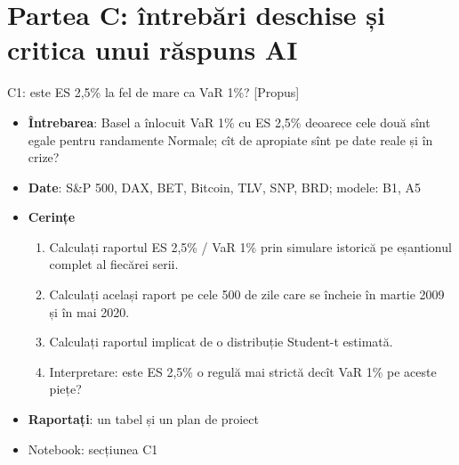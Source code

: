 \section{Partea C: întrebări deschise și critica unui răspuns AI}

\begin{frame}{C1: este ES 2,5\% la fel de mare ca VaR 1\%? [Propus]}
\itemsize{\footnotesize}
\begin{itemize}
\item \textbf{Întrebarea}: Basel a înlocuit VaR 1\% cu ES 2,5\% deoarece cele două sînt egale pentru randamente Normale; cît de apropiate sînt pe date reale și în crize?
\item \textbf{Date}: S\&P 500, DAX, BET, Bitcoin, TLV, SNP, BRD; modele: B1, A5
\item \textbf{Cerințe}
\begin{enumerate}
    \item Calculați raportul ES 2,5\% / VaR 1\% prin simulare istorică pe eșantionul complet al fiecărei serii.
    \item Calculați același raport pe cele 500 de zile care se încheie în martie 2009 și în mai 2020.
    \item Calculați raportul implicat de o distribuție Student-t estimată.
    \item Interpretare: este ES 2,5\% o regulă mai strictă decît VaR 1\% pe aceste piețe?
\end{enumerate}
\item \textbf{Raportați}: un tabel și un plan de proiect
\item Notebook: secțiunea C1
\end{itemize}
\end{frame}

